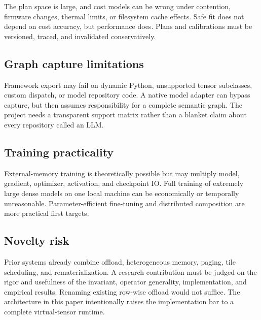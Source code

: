The plan space is large, and cost models can be wrong under contention, firmware changes, thermal limits, or filesystem cache effects. Safe fit does not depend on cost accuracy, but performance does. Plans and calibrations must be versioned, traced, and invalidated conservatively.

\subsection{Graph capture limitations}

Framework export may fail on dynamic Python, unsupported tensor subclasses, custom dispatch, or model repository code. A native model adapter can bypass capture, but then assumes responsibility for a complete semantic graph. The project needs a transparent support matrix rather than a blanket claim about every repository called an LLM.

\subsection{Training practicality}

External-memory training is theoretically possible but may multiply model, gradient, optimizer, activation, and checkpoint IO. Full training of extremely large dense models on one local machine can be economically or temporally unreasonable. Parameter-efficient fine-tuning and distributed composition are more practical first targets.

\subsection{Novelty risk}

Prior systems already combine offload, heterogeneous memory, paging, tile scheduling, and rematerialization. A research contribution must be judged on the rigor and usefulness of the invariant, operator generality, implementation, and empirical results. Renaming existing row-wise offload would not suffice. The architecture in this paper intentionally raises the implementation bar to a complete virtual-tensor runtime.
